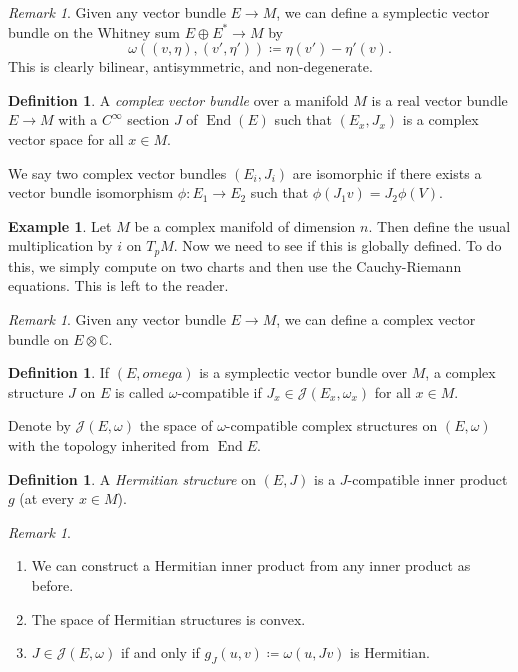 \documentclass[leqno, openany]{memoir}
\theoremstyle{definition}
\newtheorem{defn}[thm]{Definition}
\newtheorem{exm}[thm]{Example}
\theoremstyle{remark}
\newtheorem{rmk}[thm]{Remark}
\theoremstyle{plain}
\theoremstyle{definition}
\theoremstyle{remark}
\newcommand{\C}{\mathbb{C}}
\newcommand{\mc}[1]{\mathcal{#1}}
\DeclareMathOperator{\End}{End}
\begin{document}
\begin{rmk}
    Given any vector bundle $E \to M$, we can define a symplectic vector bundle on the Whitney sum $E \oplus E^* \to M$ by 
    \[ \omega((v, \eta), (v', \eta')) \coloneqq \eta(v') - \eta'(v). \]
    This is clearly bilinear, antisymmetric, and non-degenerate.
\end{rmk}

\begin{defn}
    A \textit{complex vector bundle} over a manifold $M$ is a real vector bundle $E \to M$ with a $C^{\infty}$ section $J$ of $\End(E)$ such that $(E_x, J_x)$ is a complex vector space for all $x \in M$.
\end{defn}
We say two complex vector bundles $(E_i, J_i)$ are isomorphic if there exists a vector bundle isomorphism $\phi: E_1 \to E_2$ such that $\phi(J_1 v) = J_2 \phi(V)$.

\begin{exm}
    Let $M$ be a complex manifold of dimension $n$. Then define the usual multiplication by $i$ on $T_pM$. Now we need to see if this is globally defined. To do this, we simply compute on two charts and then use the Cauchy-Riemann equations. This is left to the reader.
\end{exm}

\begin{rmk}
    Given any vector bundle $E \to M$, we can define a complex vector bundle on $E \otimes \C$.
\end{rmk}

\begin{defn}
    If $(E, omega)$ is a symplectic vector bundle over $M$, a complex structure $J$ on $E$ is called $\omega$-compatible if $J_x \in \mc{J}(E_x, \omega_x)$ for all $x \in M$.
\end{defn}
Denote by $\mc{J}(E, \omega)$ the space of $\omega$-compatible complex structures on $(E, \omega)$ with the topology inherited from $\End E$.
\begin{defn}
    A \textit{Hermitian structure} on $(E, J)$ is a $J$-compatible inner product $g$ (at every $x \in M$).
\end{defn}
\begin{rmk}
    \begin{enumerate}
        \item We can construct a Hermitian inner product from any inner product as before.
        \item The space of Hermitian structures is convex.
        \item $J \in \mc{J}(E, \omega)$ if and only if $g_J(u,v) \coloneqq \omega(u, Jv)$ is Hermitian.
    \end{enumerate}
\end{rmk}
\end{document}
